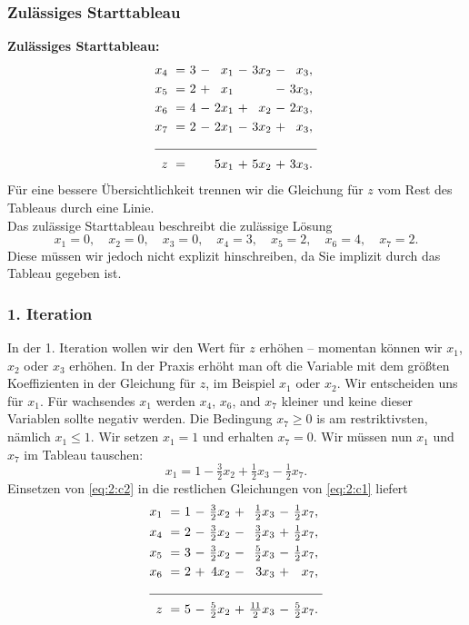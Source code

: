 \documentclass[smaller]{beamer}
\begin{document}
\begin{frame}
 \frametitle{Zul\"assiges Starttableau}
 \textbf{Zulässiges Starttableau:}
\begin{align}
\begin{alignedat}{5}
\label{eq:2:c1}
x_4 &\ = &\ 3 &\ - &\  x_1 &\ - &\ 3x_2 &\ - &\  x_3,\ \\
x_5 &\ = &\ 2 &\ + &\  x_1 &\   &\      &\ - &\ 3x_3,\ \\
x_6 &\ = &\ 4 &\ - &\ 2x_1 &\ + &\  x_2 &\ - &\ 2x_3,\ \\
x_7 &\ = &\ 2 &\ - &\ 2x_1 &\ - &\ 3x_2 &\ + &\  x_3,\ \\ \cline{1-9}
  z &\ = &\   &\   &\ 5x_1 &\ + &\ 5x_2 &\ + &\ 3x_3.\
\end{alignedat}
\end{align}
F\"ur eine bessere \"Ubersichtlichkeit trennen wir die Gleichung f\"ur $z$ vom Rest des Tableaus durch eine Linie. \\
Das zul\"assige Starttableau beschreibt die zul\"assige L\"osung
\[
x_1 = 0,\quad
x_2 = 0,\quad
x_3 = 0,\quad
x_4 = 3,\quad
x_5 = 2,\quad
x_6 = 4,\quad
x_7 = 2.
\]
Diese müssen wir jedoch nicht explizit hinschreiben, da Sie implizit durch das Tableau gegeben ist.
\end{frame}

\begin{frame}
 \frametitle{1. Iteration}
 In der 1. Iteration wollen wir den Wert für $z$ erhöhen -- momentan  können wir $x_1$, $x_2$ oder $x_3$ erhöhen. In der Praxis erhöht man oft die Variable mit dem größten Koeffizienten in der Gleichung für $z$, im Beispiel $x_1$ oder $x_2$. Wir entscheiden uns für $x_1$.
 Für wachsendes $x_1$ werden $x_4$, $x_6$, and $x_7$ kleiner und keine dieser Variablen sollte negativ werden. Die Bedingung $x_7 \ge 0$ is am restriktivsten, nämlich $x_1 \le 1$. Wir setzen $x_1 = 1$ und erhalten $x_7=0$. Wir müssen nun $x_1$ und $x_7$ im Tableau tauschen:
 \begin{equation}
\label{eq:2:c2}
x_1 = 1 - \tfrac{3}{2}x_2 + \tfrac{1}{2}x_3 - \tfrac{1}{2}x_7.
\end{equation}
Einsetzen von \eqref{eq:2:c2} in die restlichen Gleichungen von \eqref{eq:2:c1} liefert
\begin{align}
\begin{alignedat}{5}
\label{eq:2:c3}
x_1 &\ = &\ 1 &\ - &\ \tfrac{3}{2}x_2 &\ + &\  \tfrac{1}{2}x_3 &\ - &\ \tfrac{1}{2}x_7,\ \\
x_4 &\ = &\ 2 &\ - &\ \tfrac{3}{2}x_2 &\ - &\  \tfrac{3}{2}x_3 &\ + &\ \tfrac{1}{2}x_7,\ \\
x_5 &\ = &\ 3 &\ - &\ \tfrac{3}{2}x_2 &\ - &\  \tfrac{5}{2}x_3 &\ - &\ \tfrac{1}{2}x_7,\ \\
x_6 &\ = &\ 2 &\ + &\           4x_2 &\ - &\            3x_3 &\ + &\            x_7,\ \\ \cline{1-9}
  z &\ = &\ 5 &\ - &\ \tfrac{5}{2}x_2 &\ + &\ \tfrac{11}{2}x_3 &\ - &\ \tfrac{5}{2}x_7.\
\end{alignedat}
\end{align}
\end{frame}
\end{document}
